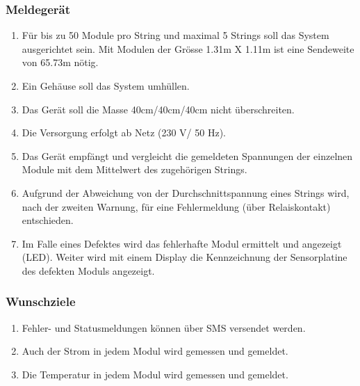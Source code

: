 \subsubsection{Meldegerät}
\begin{enumerate}
\item	Für bis zu 50 Module pro String und maximal 5 Strings soll das System ausgerichtet sein. Mit Modulen der Grösse 1.31m X 1.11m ist eine Sendeweite von 65.73m nötig.
\item	Ein Gehäuse soll das  System umhüllen.
\item Das Gerät soll die Masse 40cm/40cm/40cm nicht überschreiten.
\item	Die Versorgung erfolgt ab Netz (230 V/ 50 Hz).
\item	Das Gerät empfängt und vergleicht die gemeldeten Spannungen der einzelnen Module mit dem Mittelwert des zugehörigen Strings.
\item	Aufgrund der Abweichung von der Durchschnittspannung eines Strings wird, nach der zweiten Warnung, für eine Fehlermeldung (über Relaiskontakt) entschieden.
\item	Im Falle eines Defektes wird das fehlerhafte Modul ermittelt und angezeigt (LED). Weiter wird mit einem Display die Kennzeichnung der Sensorplatine des defekten Moduls angezeigt.
\end{enumerate}

\subsubsection{Wunschziele}
\begin{enumerate}
\item	Fehler- und Statusmeldungen können über SMS versendet werden.
\item	Auch der Strom in jedem Modul wird gemessen und gemeldet.
\item	Die Temperatur in jedem Modul wird gemessen und gemeldet.
\end{enumerate}

